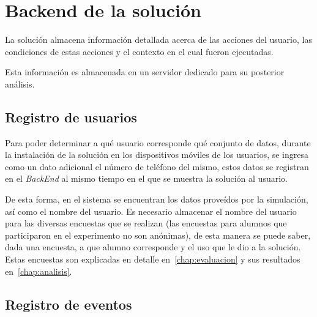 \section{Backend de la solución}

La solución almacena información detallada acerca de las acciones del usuario,
las condiciones de estas acciones y el contexto en el cual fueron ejecutadas.

Esta información es almacenada en un servidor dedicado para su posterior
análisis.



\subsection{Registro de usuarios}

Para poder determinar a qué usuario corresponde qué conjunto de datos, durante la
instalación de la solución en los dispositivos móviles de los usuarios, se ingresa como
un dato adicional el número de teléfono del mismo, estos datos se registran
en el \textit{BackEnd} al mismo tiempo en el que se muestra la solución al usuario.

De esta forma, en el sistema se encuentran los datos proveídos por la
simulación, así como el nombre del usuario. Es necesario almacenar el nombre del
usuario para las diversas encuestas que se realizan (las encuestas para alumnos
que participaron en el experimento no son anónimas), de esta manera se puede
saber, dada una encuesta, a que alumno corresponde y el uso que le dio a la
solución. Estas encuestas son explicadas en detalle en~\ref{chap:evaluacion} y sus 
resultados en~\ref{chap:analisis}.

\subsection{Registro de eventos}
\label{sec:backend_reg_eventos}

